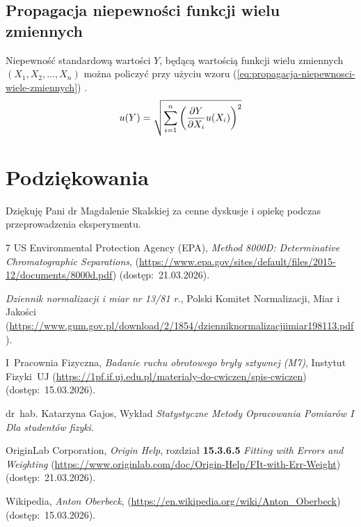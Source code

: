 \documentclass[twocolumn, a4paper, polish, 10pt]{article}
\begin{document}
\subsection{Propagacja niepewności funkcji wielu zmiennych}
Niepewność standardową wartości $Y$, będącą wartością funkcji wielu zmiennych $(X_1, X_2, \dots, X_n)$ można policzyć przy użyciu wzoru (\ref{eq:propagacja-niepewnosci-wiele-zmiennych}) \cite{smop-wyklad}.
\begin{equation}
    u(Y) = \sqrt{ \sum_{i=1}^n \left( \pdv{Y}{X_i} u(X_i) \right)^2 }
    \label{eq:propagacja-niepewnosci-wiele-zmiennych}
\end{equation}

\section{Podziękowania}
Dziękuję Pani dr Magdalenie Skalskiej za cenne dyskusje i opiekę podczas przeprowadzenia eksperymentu.

\begin{thebibliography}{7}
     US Environmental Protection Agency (EPA), \emph{Method 8000D: Determinative Chromatographic Separations}, (\url{https://www.epa.gov/sites/default/files/2015-12/documents/8000d.pdf}) (dostęp:~21.03.2026).

     \emph{Dziennik normalizacji i miar nr 13/81 r.}, Polski Komitet Normalizacji, Miar i Jakości (\url{https://www.gum.gov.pl/download/2/1854/dzienniknormalizacjiimiar198113.pdf}).

     I~Pracownia Fizyczna, \emph{Badanie ruchu obrotowego bryły sztywnej (M7)}, Instytut Fizyki~UJ (\url{https://1pf.if.uj.edu.pl/materialy-do-cwiczen/spis-cwiczen}) (dostęp:~15.03.2026).

     dr~hab. \mbox{Katarzyna} \mbox{Gajos}, Wykład \emph{Statystyczne Metody Opracowania Pomiarów I Dla studentów fizyki}.

     OriginLab Corporation, \emph{Origin Help}, rozdział \textbf{15.3.6.5} \emph{Fitting with Errors and Weighting} (\url{https://www.originlab.com/doc/Origin-Help/FIt-with-Err-Weight}) (dostęp:~21.03.2026).
    
    Wikipedia, \emph{Anton Oberbeck}, (\url{https://en.wikipedia.org/wiki/Anton_Oberbeck}) (dostęp:~15.03.2026).
\end{thebibliography}
\end{document}
